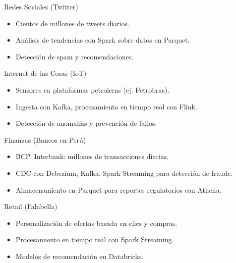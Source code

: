 \documentclass[aspectratio=169, 10pt, xcolor=table]{beamer}
\begin{document}
\begin{frame}{Redes Sociales (Twitter)}
    \begin{itemize}
        \item Cientos de millones de tweets diarios.
        \item Análisis de tendencias con Spark sobre datos en Parquet.
        \item Detección de spam y recomendaciones.
    \end{itemize}
\end{frame}

\begin{frame}{Internet de las Cosas (IoT)}
    \begin{itemize}
        \item Sensores en plataformas petroleras (ej. Petrobras).
        \item Ingesta con Kafka, procesamiento en tiempo real con Flink.
        \item Detección de anomalías y prevención de fallos.
    \end{itemize}
\end{frame}

\begin{frame}{Finanzas (Bancos en Perú)}
    \begin{itemize}
        \item BCP, Interbank: millones de transacciones diarias.
        \item CDC con Debezium, Kafka, Spark Streaming para detección de fraude.
        \item Almacenamiento en Parquet para reportes regulatorios con Athena.
    \end{itemize}
\end{frame}

\begin{frame}{Retail (Falabella)}
    \begin{itemize}
        \item Personalización de ofertas basada en clics y compras.
        \item Procesamiento en tiempo real con Spark Streaming.
        \item Modelos de recomendación en Databricks.
    \end{itemize}
\end{frame}

\end{document}
